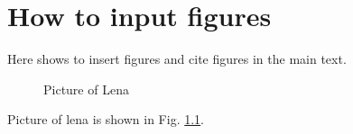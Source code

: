 \chapter{How to input figures}\label{ch:ch2}

Here shows to insert figures and cite figures in the main text.

\begin{figure}[h!]
\centering
\caption{Picture of Lena}
\label{fig:2-fig1}
\end{figure}
Picture of lena is shown in Fig. \ref{fig:2-fig1}.
